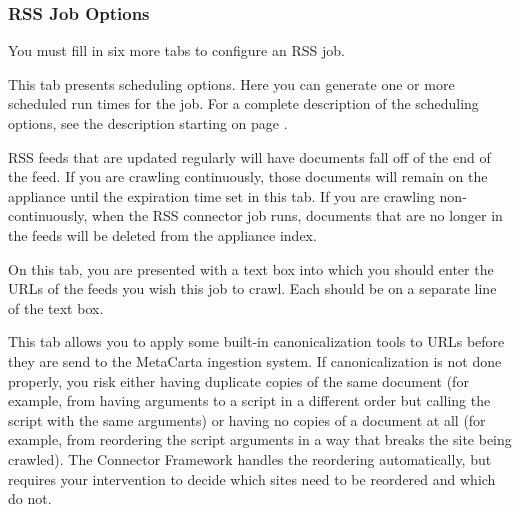 %
%

\subsubsection{RSS Job Options}

You must fill in six more tabs to configure an RSS job.


\ifJDBCGuide

\fi

\ifCombinedConnectorGuide
This tab presents scheduling options. Here you can generate one or
more scheduled run times for the job. For a complete description of
the scheduling options, see the description starting on page
\pageref{scheduling}.
\fi

RSS feeds that are updated regularly will have documents fall off of the
end of the feed. If you are crawling continuously, those documents will
remain on the appliance until the expiration time set in this tab. If you
are crawling non-continuously, when the RSS connector job runs, documents
that are no longer in the feeds will be deleted from the appliance index.


On this tab, you are presented with a text box into which you should
enter the URLs of the feeds you wish this job to crawl. Each should be
on a separate line of the text box.


This tab allows you to apply some built-in canonicalization tools
to URLs before they are send to the MetaCarta ingestion system. If
canonicalization is not done properly, you risk either having duplicate
copies of the same document (for example, from having arguments to
a script in a different order but calling the script with the same
arguments) or having no copies of a document at all (for example, from
reordering the script arguments in a way that breaks the site being
crawled). The Connector Framework handles the reordering automatically,
but requires your intervention to decide which sites need to be reordered
and which do not. 

